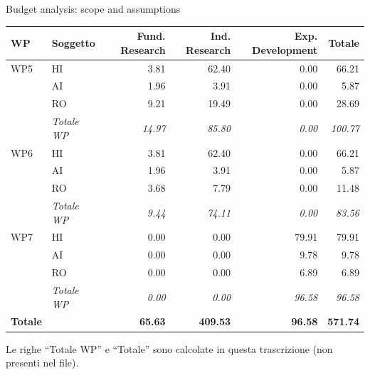 \documentclass[aspectratio=169,10pt]{beamer}
\begin{document}
\begin{frame}{Budget analysis: scope and assumptions}


\begin{table}[H]\centering\scriptsize
\begin{tabular}{llrrrr}\toprule\textbf{WP} & \textbf{Soggetto} & \textbf{Fund. Research} & \textbf{Ind. Research} & \textbf{Exp. Development} & \textbf{Totale} \\\midrule
WP5 & HI & 3.81 & 62.40 & 0.00 & 66.21 \\
 & AI & 1.96 & 3.91 & 0.00 & 5.87 \\
 & RO & 9.21 & 19.49 & 0.00 & 28.69 \\
 & \textit{Totale WP} & \textit{14.97} & \textit{85.80} & \textit{0.00} & \textit{100.77} \\\midrule
WP6 & HI & 3.81 & 62.40 & 0.00 & 66.21 \\
 & AI & 1.96 & 3.91 & 0.00 & 5.87 \\
 & RO & 3.68 & 7.79 & 0.00 & 11.48 \\
 & \textit{Totale WP} & \textit{9.44} & \textit{74.11} & \textit{0.00} & \textit{83.56} \\\midrule
WP7 & HI & 0.00 & 0.00 & 79.91 & 79.91 \\
 & AI & 0.00 & 0.00 & 9.78 & 9.78 \\
 & RO & 0.00 & 0.00 & 6.89 & 6.89 \\
 & \textit{Totale WP} & \textit{0.00} & \textit{0.00} & \textit{96.58} & \textit{96.58} \\
\midrule\textbf{Totale} & & \textbf{65.63} & \textbf{409.53} & \textbf{96.58} & \textbf{571.74} \\
\bottomrule\end{tabular}
\par\smallskip\footnotesize Le righe ``Totale WP'' e ``Totale'' sono calcolate in questa trascrizione (non presenti nel file).
\end{table}

\end{frame}
\end{document}
